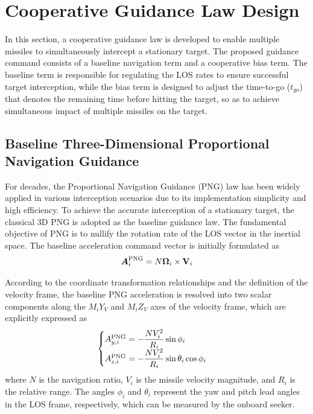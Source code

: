 \documentclass[lettersize,journal]{IEEEtran}
\begin{document}
\section{Cooperative Guidance Law Design}
In this section, a cooperative guidance law is developed to enable multiple missiles to simultaneously intercept a stationary target. The proposed guidance command consists of a baseline navigation term and a cooperative bias term. The baseline term is responsible for regulating the LOS rates to ensure successful target interception, while the bias term is designed to adjust the time-to-go ($t_{go}$) that denotes the remaining time before hitting the target, so as to achieve simultaneous impact of multiple missiles on the target.
\subsection{Baseline Three-Dimensional Proportional Navigation Guidance}
For decades, the Proportional Navigation Guidance (PNG) law has been widely applied in various interception scenarios due to its implementation simplicity and high efficiency. To achieve the accurate interception of a stationary target, the classical 3D PNG is adopted as the baseline guidance law. The fundamental objective of PNG is to nullify the rotation rate of the LOS vector in the inertial space. The baseline acceleration command vector is initially formulated as
\begin{equation}
	\label{eq:PNG_vector}
	\boldsymbol{A}_i^{{\rm{PNG}}} = N {\boldsymbol{\Omega} _i} \times {\mathbf{V}_i}
\end{equation}

According to the coordinate transformation relationships and the definition of the velocity frame, the baseline PNG acceleration is resolved into two scalar components along the $M_i Y_V$ and $M_i Z_V$ axes of the velocity frame, which are explicitly expressed as
\begin{equation}
	\label{eq:PNG_scalar}
	\begin{cases}
		A_{y,i}^{\rm{PNG}} = - \dfrac{N V_i^2}{R_i}\sin \phi_i \\
		A_{z,i}^{\rm{PNG}} = - \dfrac{N V_i^2}{R_i}\sin \theta_i \cos \phi_i
	\end{cases}
\end{equation}
where $N$ is the navigation ratio, $V_i$ is the missile velocity magnitude, and $R_i$ is the relative range. The angles $\phi_i$ and $\theta_i$ represent the yaw and pitch lead angles in the LOS frame, respectively, which can be measured by the onboard seeker.
	
\end{document}
